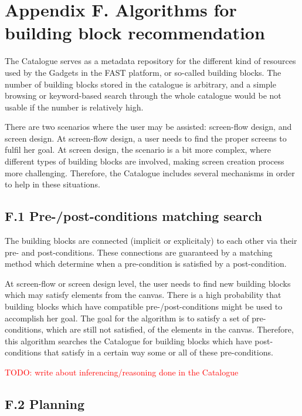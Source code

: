 \documentclass{fast_latex}
\begin{document}
\clearpage
\section*{Appendix F. Algorithms for building block recommendation}
\label{appendix_f}

The Catalogue serves as a metadata repository for the different kind of resources used by the Gadgets in the FAST platform, or so-called building blocks. The number of building blocks stored in the catalogue is arbitrary, and a simple browsing or keyword-based search through the whole catalogue would be not usable if the number is relatively high.

There are two scenarios where the user may be assisted: screen-flow design, and screen design. At screen-flow design, a user needs to find the proper screens to fulfil her goal. At screen design, the scenario is a bit more complex, where different types of building blocks are involved, making screen creation process more challenging. Therefore, the Catalogue includes several mechanisms in order to help in these situations.


\subsection*{F.1 Pre-/post-conditions matching search}

The building blocks are connected (implicit or explicitaly) to each other via their pre- and post-conditions. These connections are guaranteed by a matching method which determine when a pre-condition is satisfied by a post-condition.

At screen-flow or screen design level, the user needs to find new building blocks which may satisfy elements from the canvas. There is a high probability that building blocks which have compatible pre-/post-conditions might be used to accomplish her goal. The goal for the algorithm is to satisfy a set of pre-conditions, which are still not satisfied, of the elements in the canvas. Therefore, this algorithm searches the Catalogue for building blocks which have post-conditions that satisfy in a certain way some or all of these pre-conditions.

\textcolor{red}{TODO: write about inferencing/reasoning done in the Catalogue}


\subsection*{F.2 Planning}
\end{document}
